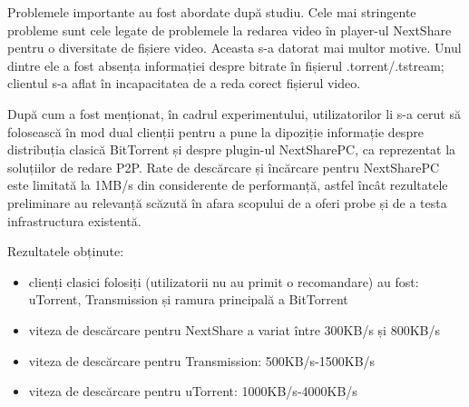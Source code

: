Problemele importante au fost abordate după studiu.  Cele mai stringente
probleme sunt cele legate de problemele la redarea video în player-ul
NextShare pentru o diversitate de fișiere video. Aceasta s-a datorat mai
multor motive. Unul dintre ele a fost absența informației despre bitrate în
fișierul .torrent/.tstream; clientul s-a aflat în incapacitatea de a reda
corect fișierul video.

După cum a fost menționat, în cadrul experimentului, utilizatorilor li s-a cerut să folosească în mod dual
clienții pentru a pune la dipoziție informație despre distribuția clasică
BitTorrent și despre plugin-ul NextSharePC, ca reprezentat la soluțiilor de
redare P2P. Rate de descărcare și încărcare pentru NextSharePC este limitată
la 1MB/s din considerente de performanță, astfel încât rezultatele preliminare
au relevanță scăzută în afara scopului de a oferi probe și de a testa
infrastructura existentă.


Rezultatele obținute:
\begin{itemize}
  \item clienți clasici folosiți (utilizatorii nu au primit o recomandare)
  au fost: uTorrent, Transmission și ramura principală a BitTorrent
  \item viteza de descărcare pentru NextShare a variat între 300KB/s și 800KB/s
  \item viteza de descărcare pentru Transmission: 500KB/s-1500KB/s
  \item viteza de descărcare pentru uTorrent: 1000KB/s-4000KB/s
\end{itemize}

